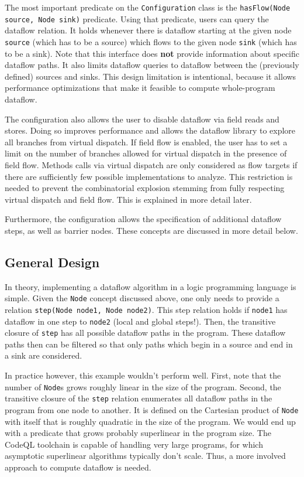 The most important predicate on the \texttt{Configuration} class 
is the \texttt{hasFlow(Node source, Node sink)} predicate.
Using that predicate, users can query the dataflow relation.
It holds whenever there is dataflow starting at the given node \texttt{source} 
(which has to be a source) which flows to the given node \texttt{sink} (which has to be a sink).
Note that this interface does \textbf{not} provide information about specific
dataflow paths.
It also limits dataflow queries to dataflow between the (previously defined) sources and sinks.
This design limitation is intentional, because it allows performance optimizations
that make it feasible to compute whole-program dataflow.

The configuration also allows the user to disable dataflow via field reads and stores.
Doing so improves performance and allows the dataflow library to explore all branches
from virtual dispatch.
If field flow is enabled, the user has to set a limit on the number of branches 
allowed for virtual dispatch in the presence of field flow.
Methods calls via virtual dispatch are only considered as flow targets if there are 
sufficiently few possible implementations to analyze.
This restriction is needed to prevent the combinatorial explosion stemming from
fully respecting virtual dispatch and field flow.
This is explained in more detail later.

Furthermore, the configuration allows the specification of additional dataflow 
steps, as well as barrier nodes.
These concepts are discussed in more detail below.

\subsection{General Design}

In theory, implementing a dataflow algorithm in a logic programming language is simple.
Given the \texttt{Node} concept discussed above, one only needs to provide a relation
\texttt{step(Node node1, Node node2)}.
This step relation holds if \texttt{node1} has dataflow in one step to \texttt{node2}
(local and global steps!).
Then, the transitive closure of \texttt{step} has all possible dataflow paths in the program.
These dataflow paths then can be filtered so that only paths which begin in a source and 
end in a sink are considered.

In practice however, this example wouldn't perform well.
First, note that the number of \texttt{Node}s grows roughly linear in the size of
the program.
Second, the transitive closure of the \texttt{step} relation enumerates all dataflow
paths in the program from one node to another.
It is defined on the Cartesian product of \texttt{Node} with itself that is roughly quadratic 
in the size of the program.
We would end up with a predicate that grows probably superlinear in the program size.
The CodeQL toolchain is capable of handling very large programs,
for which asymptotic superlinear algorithms typically don't scale.
Thus, a more involved approach to compute dataflow is needed.

